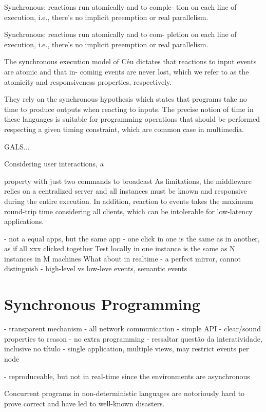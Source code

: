 \documentclass[sigplan,screen]{acmart}
\begin{document}
Synchronous: reactions run atomically and to comple-
tion on each line of execution, i.e., there’s no implicit
preemption or real parallelism.

Synchronous: reactions run atomically and to com-
pletion on each line of execution, i.e., there’s no
implicit preemption or real parallelism.

The synchronous execution model of Céu dictates
that reactions to input events are atomic and that in-
coming events are never lost, which we refer to as the
atomicity and responsiveness properties, respectively.

They rely on
the synchronous hypothesis which states that programs take no time to produce
outputs when reacting to inputs. The precise notion of time in these languages
is suitable for programming operations that should be performed respecting a
given timing constraint, which are common case in multimedia.

GALS...

Considering user interactions, a

 property
 with just two commands
 to broadcast
%
As limitations, the middleware relies on a centralized server and all instances
must be known and responsive during the entire execution.
In addition, reaction to events takes the maximum round-trip time considering
all clients, which can be intolerable for low-latency applications.

- not a equal apps, but the same app
    - one click in one is the same as in another, as if all xxx clicked together
Test locally in one instance is the same as N instances in M machines
What about in realtime
- a perfect mirror, cannot distinguish
- high-level vs low-leve events, semantic events


\section{Synchronous Programming}

- transparent mechanism
- all network communication
- simple API
- clear/sound properties to reason
- no extra programming
- ressaltar questão da interatividade, inclusive no título
  - single application, multiple views, may restrict events per node

- reproduceable, but not in real-time since the environments are asynchronous

Concurrent programs in non-deterministic languages are notoriously hard to prove correct and have led to well-known disasters.
\end{document}
